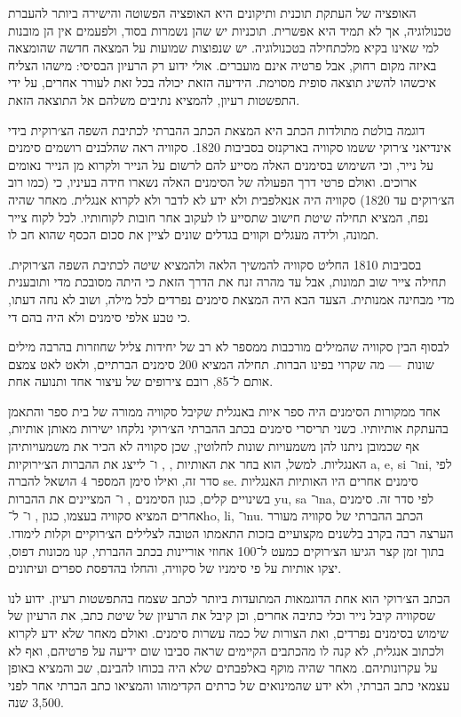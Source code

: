 האופציה של העתקת תוכנית ותיקונים היא האופציה הפשוטה והישירה ביותר להעברת טכנולוגיה, אך לא תמיד היא אפשרית. תוכניות יש שהן נשמרות בסוד, ולפעמים אין הן מובנות למי שאינו בקיא מלכתחילה בטכנולוגיה. יש שנפוצות שמועות על המצאה חדשה שהומצאה באיזה מקום רחוק, אבל פרטיה אינם מועברים. אולי ידוע רק הרעיון הבסיסי: מישהו הצליח איכשהו להשיג תוצאה סופית מסוימת. הידיעה הזאת יכולה בכל זאת לעורר אחרים, על ידי התפשטות רעיון, להמציא נתיבים משלהם אל התוצאה הזאת.

דוגמה בולטת מתולדות הכתב היא המצאת הכתב ההברתי לכתיבת השפה הצ׳רוקית בידי אינדיאני צ׳רוקי ששמו סקוויה בארקנזס בסביבות 1820. סקוויה ראה שהלבנים רושמים סימנים על נייר, וכי השימוש בסימנים האלה מסייע להם לרשום על הנייר ולקרוא מן הנייר נאומים ארוכים. ואולם פרטי דרך הפעולה של הסימנים האלה נשארו חידה בעיניו, כי (כמו רוב הצ׳רוקים עד 1820) סקוויה היה אנאלפבית ולא ידע לא לדבר ולא לקרוא אנגלית. מאחר שהיה נפח, המציא תחילה שיטת חישוב שתסייע לו לעקוב אחר חובות לקוחותיו. לכל לקוח צייר תמונה, ולידה מעגלים וקווים בגדלים שונים לציין את סכום הכסף שהוא חב לו.

בסביבות 1810 החליט סקוויה להמשיך הלאה ולהמציא שיטה לכתיבת השפה הצ׳רוקית. תחילה צייר שוב תמונות, אבל עד מהרה זנח את הדרך הזאת כי היתה מסובכת מדי ותובענית מדי מבחינה אמנותית. הצעד הבא היה המצאת סימנים נפרדים לכל מילה, ושוב לא נחה דעתו, כי טבע אלפי סימנים ולא היה בהם די.

לבסוף הבין סקוויה שהמילים מורכבות ממספר לא רב של יחידות צליל שחוזרות בהרבה מילים שונות~— מה שקרוי בפינו הברות. תחילה המציא 200 סימנים הברתיים, ולאט לאט צמצם אותם ל־85, רובם צירופים של עיצור אחד ותנועה אחת.

אחד ממקורות הסימנים היה ספר איות באנגלית שקיבל סקוויה ממורה של בית ספר והתאמן בהעתקת אותיותיו. כשני תריסרי סימנים בכתב ההברתי הצ׳רוקי נלקחו ישירות מאותן אותיות, אף שכמובן ניתנו להן משמעויות שונות לחלוטין, שכן סקוויה לא הכיר את משמעויותיהן האנגליות. למשל, הוא בחר את האותיות , ,  ו־ לייצג את ההברות הצ׳ירוקיות a, e, si ו־ni, לפי סדר זה, ואילו סימן המספר 4 הושאל להברה se. סימנים אחרים היו האותיות האנגליות בשינויים קלים, כגון הסימנים ,  ו־ המציינים את ההברות yu, sa ו־na, לפי סדר זה. סימנים אחרים המציא סקוויה בעצמו, כגון ,  ו־ ל־ho, li, ו־nu. הכתב ההברתי של סקוויה מעורר הערצה רבה בקרב בלשנים מקצועיים בזכות התאמתו הטובה לצלילים הצ׳רוקיים וקלות לימודו. בתוך זמן קצר הגיעו הצ׳רוקים כמעט ל־100 אחוזי אוריינות בכתב ההברתי, קנו מכונות דפוס, יצקו אותיות על פי סימניו של סקוויה, והחלו בהדפסת ספרים ועיתונים.

הכתב הצ׳רוקי הוא אחת הדוגמאות המתועדות ביותר לכתב שצמח בהתפשטות רעיון. ידוע לנו שסקוויה קיבל נייר וכלי כתיבה אחרים, וכן קיבל את הרעיון של שיטת כתב, את הרעיון של שימוש בסימנים נפרדים, ואת הצורות של כמה עשרות סימנים. ואולם מאחר שלא ידע לקרוא ולכתוב אנגלית, לא קנה לו מהכתבים הקיימים שראה סביבו שום ידיעה על פרטיהם, ואף לא על עקרונותיהם. מאחר שהיה מוקף באלפבתים שלא היה בכוחו להבינם, שב והמציא באופן עצמאי כתב הברתי, ולא ידע שהמינואים של כרתים הקדימוהו והמציאו כתב הברתי אחר לפני 3,500 שנה.

